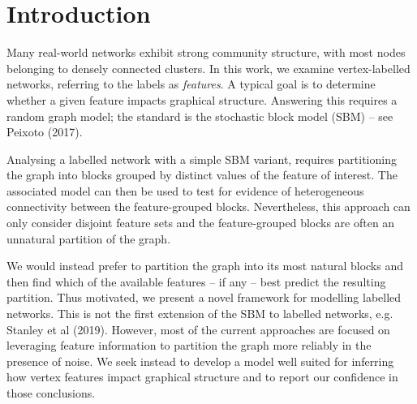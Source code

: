 \section{Introduction}

Many real-world networks exhibit strong community structure, with most nodes belonging to densely connected clusters. 
In this work, we examine vertex-labelled networks, 
referring to the labels as {\em features}. A typical goal is to determine whether a given feature impacts graphical structure. Answering this requires a random graph model;
the standard is the stochastic block model (SBM) -- see Peixoto (2017).

Analysing a labelled network with a simple SBM variant, requires partitioning the graph into blocks grouped by distinct values of the feature of interest. The associated model can then be used to test for evidence of heterogeneous connectivity between the feature-grouped blocks. Nevertheless, this approach can only consider disjoint feature sets and the feature-grouped blocks are often an unnatural partition of the graph.

We would instead prefer to partition the graph into its most natural blocks and then find which of the available features -- if any -- best predict the resulting partition. Thus motivated, we present a novel framework for modelling labelled networks.
This is not the first extension of the SBM to labelled networks, e.g. Stanley et al (2019). However, most of the current approaches are focused on leveraging feature information to partition the graph more reliably in the presence of noise.
We seek instead to develop a model well suited for inferring how vertex features impact graphical structure and to report our confidence in those conclusions.
